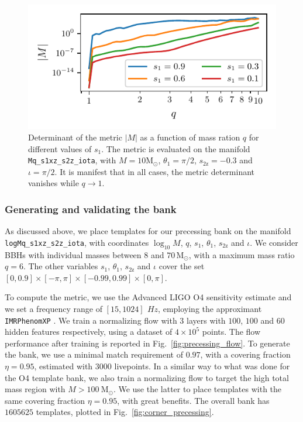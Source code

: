 \documentclass[twocolumn,showpacs,preprintnumbers,nofootinbib,prd,
superscriptaddress,10pt]{revtex4-2}
\begin{document}
\begin{figure}[t]
	\centering
	\includegraphics[scale = 1.]{metric_det_vs_q}
	\caption{Determinant of the metric $|M|$ as a function of mass ration $q$ for different values of $s_1$. The metric is evaluated on the manifold \texttt{Mq\_s1xz\_s2z\_iota}, with $M = 10\mathrm{M_\odot}$, $\theta_1 = \pi/2$, $s_\text{2z} = -0.3$ and $\iota = \pi/2$. It is manifest that in all cases, the metric determinant vanishes while $q \to 1$.}
	\label{fig:metric_vs_q}
\end{figure}

\subsubsection{Generating and validating the bank}

As discussed above, we place templates for our precessing bank on the manifold \texttt{logMq\_s1xz\_s2z\_iota}, with coordinates $\log_{10}M$, $q$, $s_\text{1}$, $\theta_\text{1}$, $s_\text{2z}$ and $\iota$.
We consider BBHs with individual masses between  $8$ and $70\,\mathrm{M_\odot}$, with a maximum mass ratio $q = 6$.
The other variables $s_\text{1}$, $\theta_\text{1}$, $s_\text{2z}$ and $\iota$ cover the set $[0, 0.9]\times[-\pi, \pi]\times[-0.99, 0.99]\times[0, \pi]$.

To compute the metric, we use the Advanced LIGO O4 sensitivity estimate \cite{O4_PSDs} and we set a frequency range of $[15, 1024] \,\SI{}{Hz}$, employing the approximant \texttt{IMRPhenomXP} \cite{Pratten:2020ceb}.
We train a normalizing flow with $3$ layers with $100$, $100$ and $60$ hidden features respectively, using a dataset of $4\times 10^5$ points.
The flow performance after training is reported in Fig.~\ref{fig:precessing_flow}.
To generate the bank, we use a minimal match requirement of $0.97$, with a covering fraction $\eta = 0.95$, estimated with $3000$ livepoints.
In a similar way to what was done for the O4 template bank, we also train a normalizing flow to target the high total mass region with $M>\SI{100}{\mathrm{M_\odot}}$. We use the latter to place templates with the same covering fraction $\eta = 0.95$, with great benefits.
The overall bank has $1605625$ templates, plotted in Fig.~\ref{fig:corner_precessing}.
\end{document}
